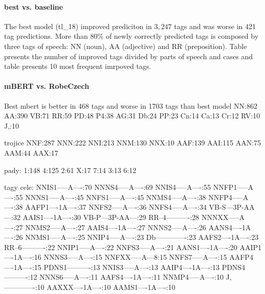 \paragraph{best vs. baseline}
The best model (tl\_18) improved prediciton in $3,247$ tags and was worse in 421 tag predictions. More than 80\% of newly correctly predicted tags is composed by three tags of speech: NN (noun), AA (adjective) and RR (preposition). Table %
presents the number of improved tags divided by parts of speech and cases and table %
presents 10 most frequent imrpoved tags. %




\paragraph{mBERT vs. RobeCzech}

Best mbert is better in 468 tags and worse in 1703 tags than best model 
NN:862
AA:390
VB:71
RR:59
PD:48
P4:38
AG:31
Db:24
PP:23
Cn:14
Ca:13
Cr:12
RV:10
J,:10

trojice
NNF:287
NNN:222
NNI:213
NNM:130
NNX:10
AAF:139
AAI:115
AAN:75
AAM:44
AAX:17

pady:
1:148
4:125
2:61
X:17
7:14
3:13
6:12

tagy cele:
NNIS1-----A----:70
NNNS4-----A----:69
NNIS4-----A----:55
NNFP1-----A----:55
NNNS1-----A----:45
NNFS1-----A----:45
NNMS4-----A----:38
NNFP4-----A----:38
AAFP1----1A----:37
NNFS2-----A----:36
NNFS4-----A----:34
VB-S---3P-AA---:32
AAIS1----1A----:30
VB-P---3P-AA---:29
RR--4----------:28
NNNXX-----A----:27
NNMS2-----A----:27
AAIS4----1A----:27
NNNS2-----A----:26
AANS4----1A----:26
NNMS1-----A----:25
NNIP4-----A----:23
Db-------------:23
AAFS2----1A----:23
RR--6----------:22
NNIP1-----A----:22
NNFS3-----A----:21
AANS1----1A----:20
AAIP1----1A----:16
NNNS3-----A----:15
NNFXX-----A---8:15
NNFS7-----A----:15
AAFP4----1A----:15
PDNS1----------:13
NNIS3-----A----:13
AAIP4----1A----:13
PDNS4----------:12
NNNS6-----A----:11
AAFS4----1A----:11
NNMP4-----A----:10
J,-------------:10
AAXXX----1A----:10
AAMS1----1A----:10
